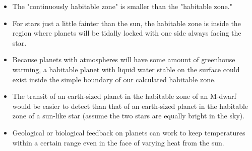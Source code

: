 \begin{enumerate}
    \begin{itemize}[label={$\bullet$}]
        \item The "continuously habitable zone" is smaller than the "habitable zone."
        \item For stars just a little fainter than the sun, the habitable zone is inside the region where planets will be tidally locked with one side always facing the star.
        \item Because planets with atmospheres will have some amount of greenhouse warming, a habitable planet with liquid water stable on the surface could exist inside the simple boundary of our calculated habitable zone.
        \item The transit of an earth-sized planet in the habitable zone of an M-dwarf would be easier to detect than that of an earth-sized planet in the habitable zone of a sun-like star (assume the two stars are equally bright in the sky).
        \item Geological or biological feedback on planets can work to keep temperatures within a certain range even in the face of varying heat from the sun.
    \end{itemize}
\end{enumerate}

